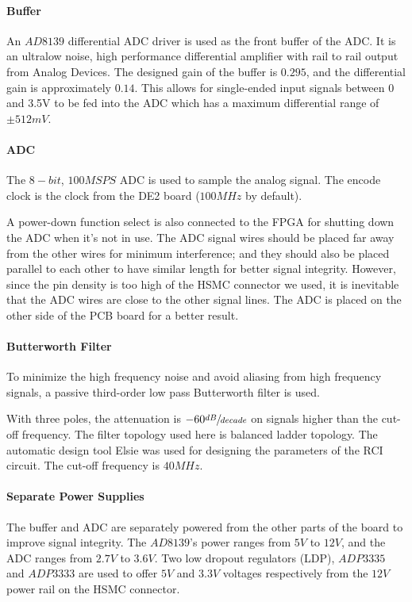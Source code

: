 \paragraph{Buffer}
An $AD8139$ differential ADC driver is used as the front buffer of the ADC.
It is an ultralow noise, high performance differential amplifier with rail to rail
output from Analog Devices. The designed gain of the buffer is $0.295$, and the differential gain is approximately $0.14$. This allows
for single-ended input signals between 0 and 3.5V to be fed into the ADC which has a maximum differential range of $\pm 512 mV$.

\paragraph{ADC}
The $8-bit$, $100MSPS$ ADC is used to sample the analog signal. The encode clock is
the clock from the DE2 board ($100MHz$ by default).

A power-down function select is also connected to the FPGA for shutting down the ADC when it’s not in use.
The ADC signal wires should be placed far away from the other wires for minimum interference;
and they should also be placed parallel to each other to have similar length for better signal integrity.
However, since the pin density is too high of the HSMC connector we used, it is inevitable that the ADC wires
are close to the other signal lines. The ADC is placed on the other side of the PCB board for a better result.


\paragraph{Butterworth Filter}
To minimize the high frequency noise and avoid aliasing from high frequency signals, a passive third-order low pass Butterworth filter
is used.

With three poles, the attenuation is $-60 \sfrac{dB}{decade}$ on signals higher than the cut-off frequency.
The filter topology used here is balanced ladder topology.
The automatic design tool Elsie was used for designing the parameters of the RCI circuit. The cut-off frequency is $40MHz$.



\paragraph{Separate Power Supplies}
The buffer and ADC are separately powered from the other parts of the board to improve signal integrity.
The $AD8139$’s power ranges from $5V$ to $12V$, and the ADC ranges from $2.7V$ to $3.6V$.
Two low dropout regulators (LDP), $ADP3335$ and $ADP3333$ are used to offer $5V$ and $3.3V$ voltages respectively from the $12V$ power rail
on the HSMC connector.


